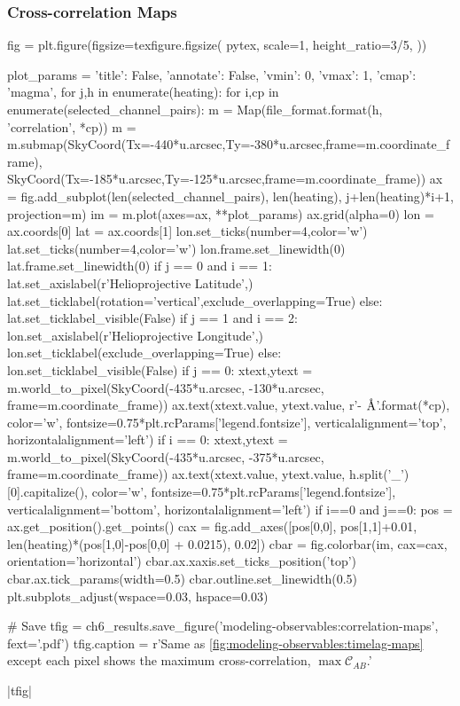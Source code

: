 \subsubsection{Cross-correlation Maps}\label{sec:modeling-observables:cross_correlation_maps}

\begin{pycode}
fig = plt.figure(figsize=texfigure.figsize(
    pytex,
    scale=1,
    height_ratio=3/5,
))

plot_params = {'title': False, 'annotate': False, 'vmin': 0, 'vmax': 1, 'cmap': 'magma',}
for j,h in enumerate(heating):
    for i,cp in enumerate(selected_channel_pairs):
        m = Map(file_format.format(h, 'correlation', *cp))
        m = m.submap(SkyCoord(Tx=-440*u.arcsec,Ty=-380*u.arcsec,frame=m.coordinate_frame),
                     SkyCoord(Tx=-185*u.arcsec,Ty=-125*u.arcsec,frame=m.coordinate_frame))
        ax = fig.add_subplot(len(selected_channel_pairs), len(heating), j+len(heating)*i+1,
                             projection=m)
        im = m.plot(axes=ax, **plot_params)
        ax.grid(alpha=0)
        lon = ax.coords[0]
        lat = ax.coords[1]
        lon.set_ticks(number=4,color='w')
        lat.set_ticks(number=4,color='w')
        lon.frame.set_linewidth(0)
        lat.frame.set_linewidth(0)
        if j == 0 and i == 1:
            lat.set_axislabel(r'Helioprojective Latitude',)
            lat.set_ticklabel(rotation='vertical',exclude_overlapping=True)
        else:
            lat.set_ticklabel_visible(False)
        if j == 1 and i == 2:
            lon.set_axislabel(r'Helioprojective Longitude',)
            lon.set_ticklabel(exclude_overlapping=True)
        else:
            lon.set_ticklabel_visible(False)
        if j == 0:
            xtext,ytext = m.world_to_pixel(SkyCoord(-435*u.arcsec, -130*u.arcsec, frame=m.coordinate_frame))
            ax.text(xtext.value, ytext.value, r'{}-{} $\si{{\angstrom}}$'.format(*cp),
                    color='w', fontsize=0.75*plt.rcParams['legend.fontsize'],
                    verticalalignment='top', horizontalalignment='left')
        if i == 0:
            xtext,ytext = m.world_to_pixel(SkyCoord(-435*u.arcsec, -375*u.arcsec, frame=m.coordinate_frame))
            ax.text(xtext.value, ytext.value, h.split('_')[0].capitalize(),
                    color='w', fontsize=0.75*plt.rcParams['legend.fontsize'],
                    verticalalignment='bottom', horizontalalignment='left')
        if i==0 and j==0:
            pos = ax.get_position().get_points()
            cax = fig.add_axes([pos[0,0], pos[1,1]+0.01, len(heating)*(pos[1,0]-pos[0,0] + 0.0215), 0.02])
            cbar = fig.colorbar(im, cax=cax, orientation='horizontal')
            cbar.ax.xaxis.set_ticks_position('top')
            cbar.ax.tick_params(width=0.5)
            cbar.outline.set_linewidth(0.5)
plt.subplots_adjust(wspace=0.03, hspace=0.03)

# Save
tfig = ch6_results.save_figure('modeling-observables:correlation-maps', fext='.pdf')
tfig.caption = r'Same as \autoref{fig:modeling-observables:timelag-maps} except each pixel shows the maximum cross-correlation, $\max\mathcal{C}_{AB}$.'
\end{pycode}
|tfig|

